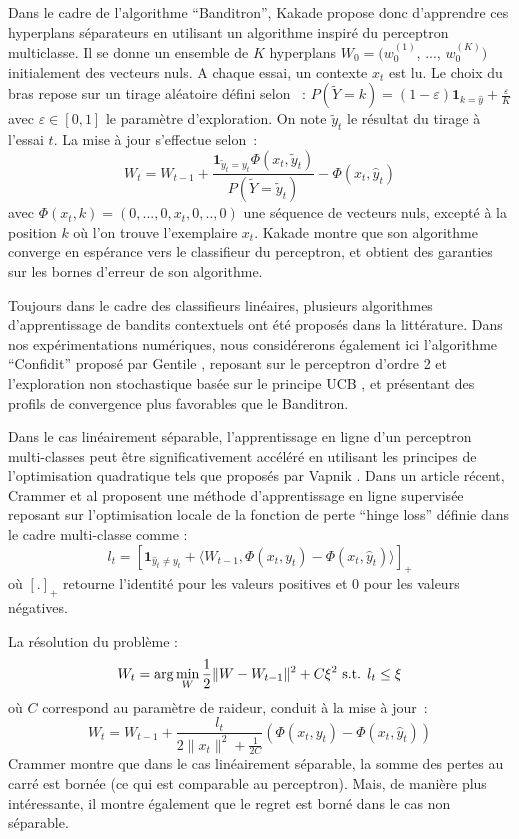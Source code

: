 \documentclass[twocolumn]{article}
\begin{document}
Dans le cadre de l'algorithme ``Banditron'', Kakade propose donc d'apprendre ces hyperplans séparateurs en utilisant un algorithme inspiré du perceptron multiclasse. Il se donne un ensemble de $K$ hyperplans $W_0 = (w^{(1)}_0$, ..., $w^{(K)}_0)$ initialement des vecteurs nuls. A chaque essai, un contexte $x_t$ est lu. Le choix du bras repose sur un tirage aléatoire défini selon~ : $P(\tilde{Y}=k) = (1 - \varepsilon) \mathbf{1}_{k = \hat{y}} + \frac{\varepsilon}{K} $ avec $\varepsilon \in [0,1]$ le paramètre d'exploration. On note $\tilde{y}_t$ le résultat du tirage à l'essai $t$. La mise à jour s'effectue selon~:
$$ W_t = W_{t-1} + \frac{\mathbf{1}_{\tilde{y}_t = y_t} \Phi(x_t,\tilde{y}_t)}{P(\tilde{Y}=\tilde{y}_t)} - \Phi(x_t,\hat{y}_t)$$   
avec $\Phi(x_t,k) = (0, ..., 0,  x_t, 0, .., 0)$ une séquence de vecteurs nuls, excepté à la position $k$ où l'on trouve l'exemplaire $x_t$. Kakade montre que son algorithme converge en espérance vers le classifieur du perceptron, et obtient des garanties sur les bornes d'erreur de son algorithme. 

Toujours dans le cadre des classifieurs linéaires, plusieurs algorithmes d'apprentissage de bandits contextuels ont été proposés dans la littérature. Dans nos expérimentations numériques, nous considérerons également ici l'algorithme ``Confidit'' proposé par Gentile \cite{XXX}, reposant sur le perceptron d'ordre 2 et l'exploration non stochastique basée sur le principe UCB \cite{XXX}, et présentant des profils de convergence plus favorables que le Banditron. 


Dans le cas linéairement séparable, l'apprentissage en ligne d'un perceptron multi-classes peut être significativement accéléré en utilisant les principes de l'optimisation quadratique tels que proposés par Vapnik \cite{XXX}. Dans un article récent, Crammer et al \cite{XXX} proposent une méthode d'apprentissage en ligne supervisée reposant sur l'optimisation locale de la fonction de perte ``hinge loss'' définie dans le cadre multi-classe comme : 
$$
	 l_t =[\mathbf{1}_{\hat{y}_t\neq y_t} + \langle W_{t-1}, \Phi(x_t,y_t)- \Phi(x_t,\hat{y}_t)\rangle]_+ 
$$
où $[.]_+$ retourne l'identité pour les valeurs positives et 0 pour les valeurs négatives. 

La résolution du problème :
$$W_{t} = \arg \min_W \frac{1}{2} \| W - W_{t-1}\|^2 + C \xi^2 \hbox{ s.t. } l_t \leq \xi$$
où $C$ correspond au paramètre de raideur, conduit à la mise à jour~:
$$W_{t} =  W_{t-1} + \frac{l_t}{2\|x_t\|^2 + \frac{1}{2C}} (\Phi(x_t,y_t) - \Phi(x_t,\hat{y}_t))$$
Crammer montre que dans le cas linéairement séparable, la somme des pertes au carré est bornée (ce qui est comparable au perceptron). Mais, de manière plus intéressante, il montre également que le regret est  borné dans le cas non séparable.  
\end{document}
